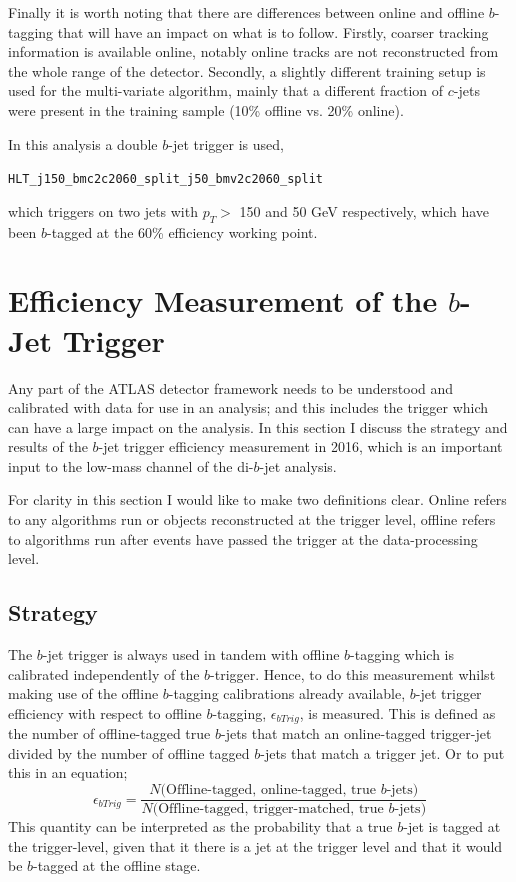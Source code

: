 Finally it is worth noting that there are  differences between online and offline $b$-tagging that will have an impact on what is to follow.
Firstly, coarser tracking information is available online, notably online tracks are not reconstructed from the whole range of the detector.
Secondly, a slightly different training setup is used for the multi-variate algorithm, mainly that a different fraction of $c$-jets were present in the training sample
(10\% offline vs. 20\% online).

In this analysis a double $b$-jet trigger is used,
\begin{center}
\verb|HLT_j150_bmc2c2060_split_j50_bmv2c2060_split|
\end{center}
which triggers on two jets with $p_T >$ 150 and 50 GeV respectively,
which have been $b$-tagged at the 60\% efficiency working point.

\newpage

\section{Efficiency Measurement of the $b$-Jet Trigger}
\label{sec:trig-bjet_eff}

Any part of the ATLAS detector framework needs to be understood and calibrated with data for use in an analysis;
and this includes the trigger which can have a large impact on the analysis.
In this section I discuss the strategy and results of the $b$-jet trigger efficiency measurement in 2016,
which is an important input to the low-mass channel of the di-$b$-jet analysis.

For clarity in this section I would like to make two definitions clear.
Online refers to any algorithms run or objects reconstructed at the trigger level,
offline refers to algorithms run after events have passed the trigger at the data-processing level. 

\subsection{Strategy}
The $b$-jet trigger is always used in tandem with offline $b$-tagging which is calibrated independently of the $b$-trigger.
Hence, to do this measurement whilst making use of the offline $b$-tagging calibrations already available,
$b$-jet trigger efficiency with respect to offline $b$-tagging, $\epsilon_{bTrig}$, is measured.
This is defined as the number of offline-tagged true $b$-jets that match an online-tagged trigger-jet
divided by the number of offline tagged $b$-jets that match a trigger jet.
Or to put this in an equation;
\begin{equation}
 \epsilon_{bTrig} = \frac{N(\text{Offline-tagged, online-tagged, true $b$-jets)}}{N(\text{Offline-tagged, trigger-matched, true $b$-jets)}}
\end{equation}
This quantity can be interpreted as the probability that a true $b$-jet is tagged at the trigger-level,
given that it there is a jet at the trigger level and that it would be $b$-tagged at the offline stage.

